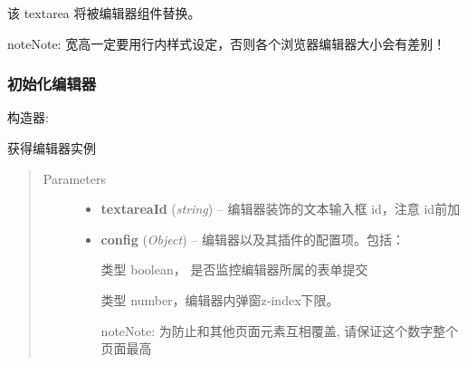 \documentclass[letterpaper,10pt,english]{sphinxmanual}
\begin{document}
该 textarea 将被编辑器组件替换。

\begin{notice}{note}{Note:}
宽高一定要用行内样式设定，否则各个浏览器编辑器大小会有差别！
\end{notice}


\subsubsection{初始化编辑器}
\label{relatedproj/editorguide/usage::doc}\label{relatedproj/editorguide/usage:id1}
构造器:


\begin{fulllineitems}
\label{relatedproj/editorguide/usage:Editor.KISSY.Editor}
获得编辑器实例
\begin{quote}\begin{description}
\item[{Parameters}] \leavevmode\begin{itemize}
\item {}
\textbf{textareaId} (\emph{string}) -- 编辑器装饰的文本输入框 id，注意 id前加 \code{\#}

\item {}
\textbf{config} (\emph{Object}) --
编辑器以及其插件的配置项。包括：


\begin{fulllineitems}
\label{relatedproj/editorguide/usage:Editor.KISSY.Editor.config.attachForm}
类型 boolean， 是否监控编辑器所属的表单提交

\end{fulllineitems}



\begin{fulllineitems}
\label{relatedproj/editorguide/usage:Editor.KISSY.Editor.config.baseZIndex}
类型 number，编辑器内弹窗z-index下限。

\begin{notice}{note}{Note:}
为防止和其他页面元素互相覆盖, 请保证这个数字整个页面最高
\end{notice}


\end{fulllineitems}
\end{itemize}
\end{description}
\end{quote}
\end{fulllineitems}
\end{document}
